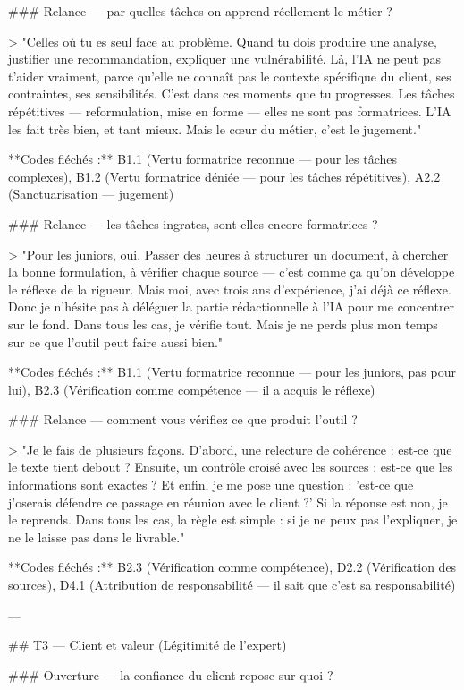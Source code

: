 ### Relance — par quelles tâches on apprend réellement le métier ?

> "Celles où tu es seul face au problème. Quand tu dois produire une analyse, justifier une recommandation, expliquer une vulnérabilité. Là, l'IA ne peut pas t'aider vraiment, parce qu'elle ne connaît pas le contexte spécifique du client, ses contraintes, ses sensibilités. C'est dans ces moments que tu progresses. Les tâches répétitives — reformulation, mise en forme — elles ne sont pas formatrices. L'IA les fait très bien, et tant mieux. Mais le cœur du métier, c'est le jugement."

**Codes fléchés :** B1.1 (Vertu formatrice reconnue — pour les tâches complexes), B1.2 (Vertu formatrice déniée — pour les tâches répétitives), A2.2 (Sanctuarisation — jugement)

### Relance — les tâches ingrates, sont-elles encore formatrices ?

> "Pour les juniors, oui. Passer des heures à structurer un document, à chercher la bonne formulation, à vérifier chaque source — c'est comme ça qu'on développe le réflexe de la rigueur. Mais moi, avec trois ans d'expérience, j'ai déjà ce réflexe. Donc je n'hésite pas à déléguer la partie rédactionnelle à l'IA pour me concentrer sur le fond. Dans tous les cas, je vérifie tout. Mais je ne perds plus mon temps sur ce que l'outil peut faire aussi bien."

**Codes fléchés :** B1.1 (Vertu formatrice reconnue — pour les juniors, pas pour lui), B2.3 (Vérification comme compétence — il a acquis le réflexe)

### Relance — comment vous vérifiez ce que produit l'outil ?

> "Je le fais de plusieurs façons. D'abord, une relecture de cohérence : est-ce que le texte tient debout ? Ensuite, un contrôle croisé avec les sources : est-ce que les informations sont exactes ? Et enfin, je me pose une question : 'est-ce que j'oserais défendre ce passage en réunion avec le client ?' Si la réponse est non, je le reprends. Dans tous les cas, la règle est simple : si je ne peux pas l'expliquer, je ne le laisse pas dans le livrable."

**Codes fléchés :** B2.3 (Vérification comme compétence), D2.2 (Vérification des sources), D4.1 (Attribution de responsabilité — il sait que c'est sa responsabilité)

---

## T3 — Client et valeur (Légitimité de l'expert)

### Ouverture — la confiance du client repose sur quoi ?

